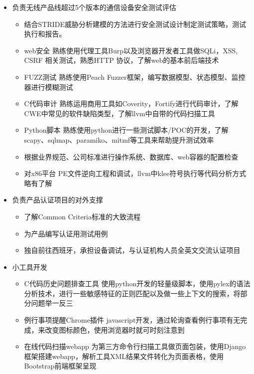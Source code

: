 \documentclass{resume}
\begin{document}
\begin{itemize}
  \item 负责无线产品线超过5个版本的通信设备安全测试评估
  \begin{itemize}
    \item 结合STRIDE威胁分析建模的方法进行安全测试设计制定测试策略，测试执行和报告。
    \item web安全 熟练使用代理工具Burp以及浏览器开发者工具做SQLi，XSS, CSRF 相关测试，熟悉HTTP 协议，了解web的基本前后端技术
    \item FUZZ测试 熟练使用Peach Fuzzer框架，编写数据模型、状态模型、监控器进行模糊测试
    \item C代码审计 熟练运用商用工具如Coverity，Fortify进行代码审计，了解CWE中常见的软件缺陷类型，了解llvm中自带的代码扫描工具
    \item Python脚本 熟练使用python进行一些测试脚本/POC的开发，了解scapy、sqlmap、paramiko、mitmf等工具来帮助提升测试效率
    \item 根据业界规范、公司标准进行操作系统、数据库、web容器的配置检查
    \item 对x86平台 PE文件逆向工程和调试，llvm中klee符号执行等代码分析方式略有了解
  \end{itemize}
  
  \item 负责产品认证项目的对外支撑
  \begin{itemize}
    \item 了解Common Criteria标准的大致流程
    \item 为产品编写认证用测试用例
    \item 独自前往西班牙，承担设备调试，与认证机构人员全英文交流认证项目
  \end{itemize}
  
  \item 小工具开发
  \begin{itemize}
    \item C代码历史问题排查工具 使用python开发的轻量级脚本，使用pylex的语法分析技术，进行一些敏感特征的正则匹配以及做一些上下文的搜索，将部分问题举一反三
    \item 例行事项提醒Chrome插件 javascript开发，通过轮询查看例行事项有无完成，来改变图标颜色，使用浏览器时就可时刻注意到
    \item 在线代码扫描webapp 为第三方命令行扫描工具做页面包装，使用Django框架搭建webapp，解析工具XML结果文件转化为页面表格，使用Bootstrap前端框架呈现
  \end{itemize}
\end{itemize}
\end{document}
